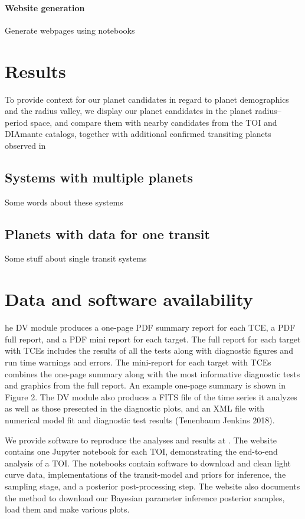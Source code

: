 \documentclass[floatfix,ApJL,twocolumn]{aastex631}
\begin{document}
\paragraph{Website generation}
Generate webpages using notebooks



\section{Results}\label{sec:results}


To provide context for our planet candidates in regard to
planet demographics and the radius valley, we display our
planet candidates in the planet radius–period space, and compare them with nearby candidates from the TOI and DIAmante catalogs, together with additional confirmed transiting planets observed in





\subsection{Systems with multiple planets}
Some words about these systems

\subsection{Planets with data for one transit}
Some stuff about single transit systems


\section{Data and software availability}\label{sec:data}

he DV module produces a one-page PDF summary report for each TCE, a PDF full report, and a PDF mini report for each target. The full report for each target with TCEs includes the results of all the tests along with diagnostic figures and run time warnings and errors. The mini-report for each target with TCEs combines the one-page summary along with the most informative diagnostic tests and graphics from the full report. An example one-page summary is shown in Figure 2. The DV module also produces a FITS file of the time series it analyzes as well as those presented in the diagnostic plots, and an XML file with numerical model fit and diagnostic test results (Tenenbaum  Jenkins 2018).

We provide software to reproduce the analyses and results at \atlasUrl.
The website contains one Jupyter notebook for each TOI, demonstrating the end-to-end analysis of a TOI.
The notebooks contain software to download and clean light curve data, implementations of the transit-model and priors for inference, the \pymc sampling stage, and a posterior post-processing step.
The website also documents the method to download our Bayesian parameter inference posterior samples, load them and make various plots.
\end{document}
